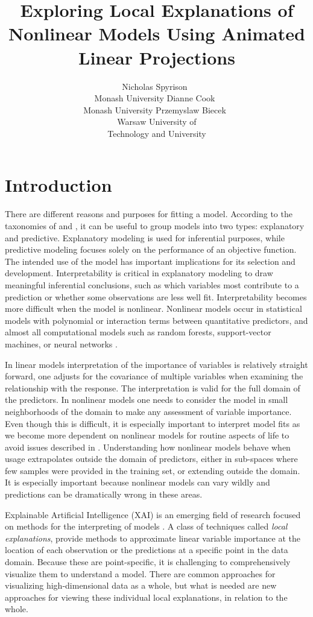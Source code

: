 \documentclass[
]{jss}
\author{
Nicholas Spyrison~\orcidlink{0000-0002-8417-0212}\\Monash
University \And Dianne Cook~\orcidlink{0000-0002-3813-7155}\\Monash
University \And Przemyslaw
Biecek~\orcidlink{0000-0001-8423-1823}\\Warsaw University of\\
Technology and University
}
\title{Exploring Local Explanations of Nonlinear Models Using Animated
Linear Projections}
\begin{document}
\hypertarget{sec:intro}{%
\section{Introduction}\label{sec:intro}}

There are different reasons and purposes for fitting a model. According
to the taxonomies of \citet{breiman_statistical_2001} and
\citet{shmueli_explain_2010}, it can be useful to group models into two
types: explanatory and predictive. Explanatory modeling is used for
inferential purposes, while predictive modeling focuses solely on the
performance of an objective function. The intended use of the model has
important implications for its selection and development.
Interpretability is critical in explanatory modeling to draw meaningful
inferential conclusions, such as which variables most contribute to a
prediction or whether some observations are less well fit.
Interpretability becomes more difficult when the model is nonlinear.
Nonlinear models occur in statistical models with polynomial or
interaction terms between quantitative predictors, and almost all
computational models such as random forests, support-vector machines, or
neural networks
\citep[e.g.][]{breiman_random_2001, boser_training_1992, anderson_introduction_1995}.

In linear models interpretation of the importance of variables is
relatively straight forward, one adjusts for the covariance of multiple
variables when examining the relationship with the response. The
interpretation is valid for the full domain of the predictors. In
nonlinear models one needs to consider the model in small neighborhoods
of the domain to make any assessment of variable importance. Even though
this is difficult, it is especially important to interpret model fits as
we become more dependent on nonlinear models for routine aspects of life
to avoid issues described in \citet{stahl-ethics}. Understanding how
nonlinear models behave when usage extrapolates outside the domain of
predictors, either in sub-spaces where few samples were provided in the
training set, or extending outside the domain. It is especially
important because nonlinear models can vary wildly and predictions can
be dramatically wrong in these areas.

Explainable Artificial Intelligence (XAI) is an emerging field of
research focused on methods for the interpreting of models
\citep{adadi_peeking_2018, arrieta_explainable_2020}. A class of
techniques called \emph{local explanations}, provide methods to
approximate linear variable importance at the location of each
observation or the predictions at a specific point in the data domain.
Because these are point-specific, it is challenging to comprehensively
visualize them to understand a model. There are common approaches for
visualizing high-dimensional data as a whole, but what is needed are new
approaches for viewing these individual local explanations, in relation
to the whole.
\end{document}
